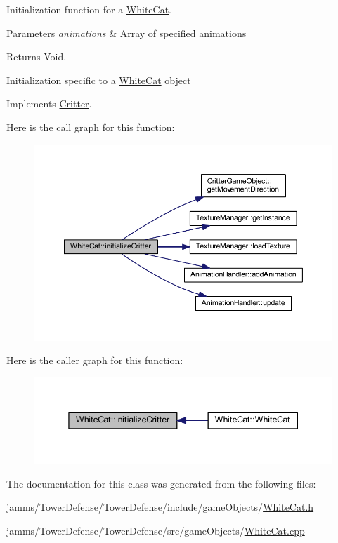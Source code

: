 Initialization function for a \hyperlink{class_white_cat}{White\+Cat}. 


\begin{DoxyParams}{Parameters}
{\em animations} & Array of specified animations \\
\hline
\end{DoxyParams}
\begin{DoxyReturn}{Returns}
Void.
\end{DoxyReturn}
Initialization specific to a \hyperlink{class_white_cat}{White\+Cat} object 

Implements \hyperlink{class_critter_ad425da71f01445ee175e5f98d94ca0ba}{Critter}.



Here is the call graph for this function\+:\nopagebreak
\begin{figure}[H]
\begin{center}
\leavevmode
\includegraphics[width=350pt]{class_white_cat_a0a3c801e7a6b451b2b1caef9da137585_cgraph}
\end{center}
\end{figure}




Here is the caller graph for this function\+:\nopagebreak
\begin{figure}[H]
\begin{center}
\leavevmode
\includegraphics[width=345pt]{class_white_cat_a0a3c801e7a6b451b2b1caef9da137585_icgraph}
\end{center}
\end{figure}




The documentation for this class was generated from the following files\+:\begin{DoxyCompactItemize}
\item 
jamms/\+Tower\+Defense/\+Tower\+Defense/include/game\+Objects/\hyperlink{_white_cat_8h}{White\+Cat.\+h}\item 
jamms/\+Tower\+Defense/\+Tower\+Defense/src/game\+Objects/\hyperlink{_white_cat_8cpp}{White\+Cat.\+cpp}\end{DoxyCompactItemize}

